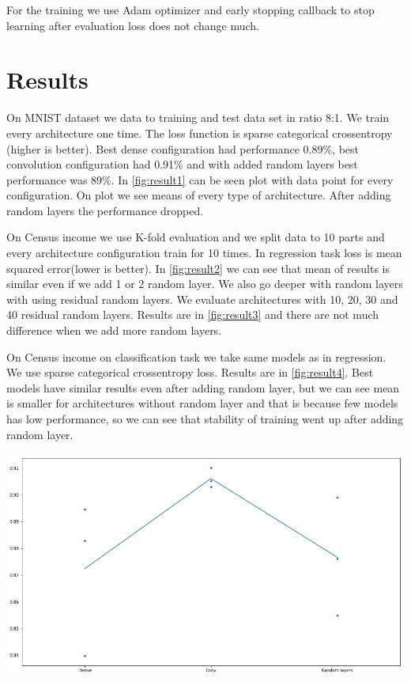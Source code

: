 \documentclass[]{article}
\newenvironment{Figure}
{\par\medskip\noindent\minipage{\linewidth}}
{\endminipage\par\medskip}
\begin{document}
\begin{multicols}{2}
	For the training we use Adam optimizer and early stopping callback to stop learning after evaluation loss does not change much.
	
	\section{Results}
	On MNIST dataset we data to training and test data set in ratio 8:1. We train every architecture one time. The loss function is sparse categorical crossentropy (higher is better). Best dense configuration had performance 0.89\%, best convolution configuration had 0.91\% and with added random layers best performance was 89\%. In \ref{fig:result1} can be seen plot with data point for every configuration. On plot we see means of every type of architecture. After adding random layers the performance dropped.
	
	On Census income we use K-fold evaluation and we split data to 10 parts and every architecture configuration train for 10 times. In regression task loss is mean squared error(lower is better). In \ref{fig:result2} we can see that mean of results is similar even if we add 1 or 2 random layer. We also go deeper with random layers with using residual random layers. We evaluate architectures with 10, 20, 30 and 40 residual random layers. Results are in \ref{fig:result3} and there are not much difference when we add more random layers.
	
	On Census income on classification task we take same models as in regression. We use sparse categorical crossentropy loss. Results are in \ref{fig:result4}. Best models have similar results even after adding random layer, but we can see mean is smaller for architectures without random layer and that is because few models has low performance, so we can see that stability of training went up after adding random layer.	
	
	\begin{Figure}
		\centering
		\includegraphics[width=\linewidth]{figure1.png}
		\label{fig:result1}
	\end{Figure}


\end{multicols}
\end{document}
